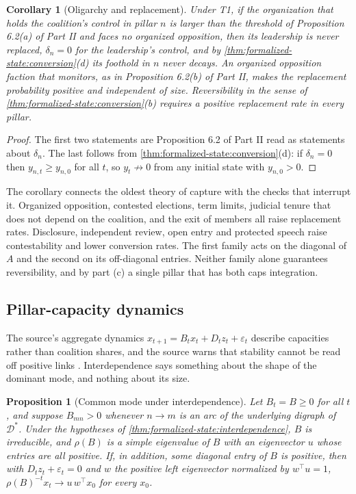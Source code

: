 \documentclass[11pt,letterpaper]{article}
\newtheorem{proposition}[theorem]{Proposition}
\newtheorem{corollary}[theorem]{Corollary}
\theoremstyle{definition}
\theoremstyle{remark}
\newcommand{\Dstar}{\mathcal{D}^{*}}
\begin{document}
\begin{corollary}[Oligarchy and replacement]
\label{cor:formalized-state:michels}
Under T1, if the organization that holds the coalition's control in pillar $n$ is larger than the threshold of Proposition 6.2(a) of Part II and faces no organized opposition, then its leadership is never replaced, $\delta_n=0$ for the leadership's control, and by \cref{thm:formalized-state:conversion}(d) its foothold in $n$ never decays. An organized opposition faction that monitors, as in Proposition 6.2(b) of Part II, makes the replacement probability positive and independent of size. Reversibility in the sense of \cref{thm:formalized-state:conversion}(b) requires a positive replacement rate in every pillar.
\end{corollary}

\begin{proof}
The first two statements are Proposition 6.2 of Part II read as statements about $\delta_n$. The last follows from \cref{thm:formalized-state:conversion}(d): if $\delta_n=0$ then $y_{n,t}\ge y_{n,0}$ for all $t$, so $y_t\not\to0$ from any initial state with $y_{n,0}>0$.
\end{proof}

The corollary connects the oldest theory of capture with the checks that interrupt it. Organized opposition, contested elections, term limits, judicial tenure that does not depend on the coalition, and the exit of members all raise replacement rates. Disclosure, independent review, open entry and protected speech raise contestability and lower conversion rates. The first family acts on the diagonal of $A$ and the second on its off-diagonal entries. Neither family alone guarantees reversibility, and by part (c) a single pillar that has both caps integration.

\subsection{Pillar-capacity dynamics}

The source's aggregate dynamics $x_{t+1}=B_tx_t+D_tz_t+\varepsilon_t$ describe capacities rather than coalition shares, and the source warns that stability cannot be read off positive links \citep{largo2026hbs}. Interdependence says something about the shape of the dominant mode, and nothing about its size.

\begin{proposition}[Common mode under interdependence]
\label{prop:formalized-state:perron}
Let $B_t=B\ge0$ for all $t$, and suppose $B_{mn}>0$ whenever $n\to m$ is an arc of the underlying digraph of $\Dstar$. Under the hypotheses of \cref{thm:formalized-state:interdependence}, $B$ is irreducible, and $\rho(B)$ is a simple eigenvalue of $B$ with an eigenvector $u$ whose entries are all positive. If, in addition, some diagonal entry of $B$ is positive, then with $D_tz_t+\varepsilon_t=0$ and $w$ the positive left eigenvector normalized by $w^{\top}u=1$, $\rho(B)^{-t}x_t\to u\,w^{\top}x_0$ for every $x_0$.
\end{proposition}
\end{document}
